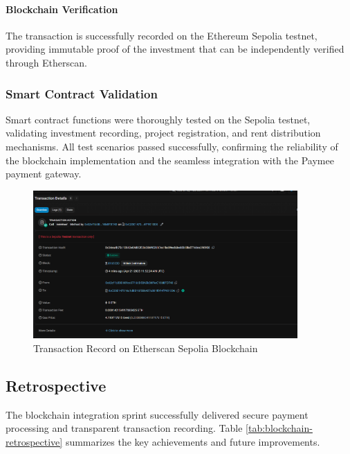 \paragraph{Blockchain Verification}
The transaction is successfully recorded on the Ethereum Sepolia testnet, providing immutable proof of the investment that can be independently verified through Etherscan.
\subsubsection{Smart Contract Validation}
Smart contract functions were thoroughly tested on the Sepolia testnet, validating investment recording, project registration, and rent distribution mechanisms. All test scenarios passed successfully, confirming the reliability of the blockchain implementation and the seamless integration with the Paymee payment gateway.

\newpage
\begin{figure}[htbp]
    \centering
    \includegraphics[width=0.9\textwidth]{images/etherscan_blockchain_record.png}
    \caption{Transaction Record on Etherscan Sepolia Blockchain}
    \label{fig:etherscan-blockchain-record}
\end{figure}


\subsection{Retrospective}

The blockchain integration sprint successfully delivered secure payment processing and transparent transaction recording. Table \ref{tab:blockchain-retrospective} summarizes the key achievements and future improvements.

